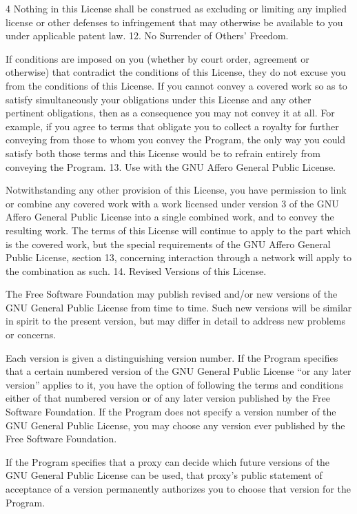 \documentclass[fontsize=11pt,paper=A4,BCOR=12mm,DIV=13,open=any,listof=totoc,toc=flat]{scrbook}
\begin{document}
{\begin{multicols}{4}
Nothing in this License shall be construed as excluding or limiting any implied license or other defenses to infringement that may otherwise be available to you under applicable patent law.
12. No Surrender of Others' Freedom.

If conditions are imposed on you (whether by court order, agreement or otherwise) that contradict the conditions of this License, they do not excuse you from the conditions of this License. If you cannot convey a covered work so as to satisfy simultaneously your obligations under this License and any other pertinent obligations, then as a consequence you may not convey it at all. For example, if you agree to terms that obligate you to collect a royalty for further conveying from those to whom you convey the Program, the only way you could satisfy both those terms and this License would be to refrain entirely from conveying the Program.
13. Use with the GNU Affero General Public License.

Notwithstanding any other provision of this License, you have permission to link or combine any covered work with a work licensed under version 3 of the GNU Affero General Public License into a single combined work, and to convey the resulting work. The terms of this License will continue to apply to the part which is the covered work, but the special requirements of the GNU Affero General Public License, section 13, concerning interaction through a network will apply to the combination as such.
14. Revised Versions of this License.

The Free Software Foundation may publish revised and/or new versions of the GNU General Public License from time to time. Such new versions will be similar in spirit to the present version, but may differ in detail to address new problems or concerns.

Each version is given a distinguishing version number. If the Program specifies that a certain numbered version of the GNU General Public License “or any later version” applies to it, you have the option of following the terms and conditions either of that numbered version or of any later version published by the Free Software Foundation. If the Program does not specify a version number of the GNU General Public License, you may choose any version ever published by the Free Software Foundation.

If the Program specifies that a proxy can decide which future versions of the GNU General Public License can be used, that proxy's public statement of acceptance of a version permanently authorizes you to choose that version for the Program.


\end{multicols}}
\end{document}
